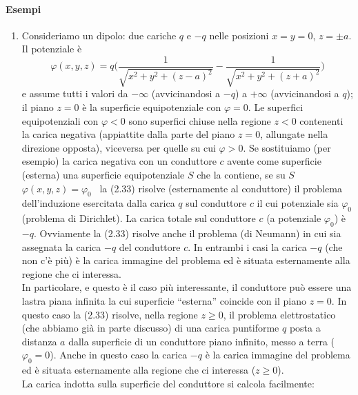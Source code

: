 \paragraph{Esempi}
\begin{enumerate}
  \item Consideriamo un dipolo: due cariche $q$ e $-q$ nelle posizioni $x=y=0$,
    $z=\pm a$.\\
    Il potenziale \`e
    \begin{equation}
      \varphi(x,y,z)=q\Big(\frac{1}{\sqrt{x^2+y^2+(z-a)^2}}
      -\frac{1}{\sqrt{x^2+y^2+(z+a)^2}}\Big)
      \tag{2.33}
    \end{equation}
    e assume tutti i valori da $-\infty$ (avvicinandosi a $-q$) a $+\infty$
    (avvicinandosi a $q$); il piano $z=0$ \`e la superficie equipotenziale con
    $\varphi=0$. Le superfici equipotenziali con $\varphi<0$ sono superfici
    chiuse nella regione $z<0$ contenenti la carica negativa (appiattite dalla
    parte del piano $z=0$, allungate nella direzione opposta), viceversa per
    quelle su cui $\varphi>0$. Se sostituiamo (per esempio) la carica negativa
    con un conduttore $c$ avente come superficie (esterna) una superficie
    equipotenziale $S$ che la contiene, se su $S$ \ $\varphi(x,y,z)=\varphi_0$
    \ la (2.33) risolve (esternamente al conduttore) il problema dell'induzione
    esercitata dalla carica $q$ sul conduttore $c$ il cui potenziale sia
    $\varphi_0$ (problema di Dirichlet). La carica totale sul conduttore $c$ (a
    potenziale $\varphi_0$) \`e $-q$.
    Ovviamente la (2.33) risolve anche il problema (di Neumann) in cui sia
    assegnata la carica $-q$ del conduttore $c$. In entrambi i casi la carica
    $-q$ (che non c'\`e pi\`u) \`e la carica immagine del problema ed \`e
    situata esternamente alla regione che ci interessa.\\
    In particolare, e questo \`e il caso pi\`u interessante, il conduttore pu\`o
    essere una lastra piana infinita la cui superficie ``esterna'' coincide con
    il piano $z=0$. In questo caso la (2.33) risolve, nella regione $z\ge0$, il
    problema elettrostatico (che abbiamo gi\`a in parte discusso) di una carica
    puntiforme $q$ posta a distanza $a$ dalla superficie di un conduttore piano
    infinito, messo a terra ($\varphi_0=0$). Anche in questo caso la carica $-q$
    \`e la carica immagine del problema ed \`e situata esternamente alla regione
    che ci interessa ($z\ge0$).\\
    La carica indotta sulla superficie del conduttore si calcola facilmente:

\end{enumerate}
